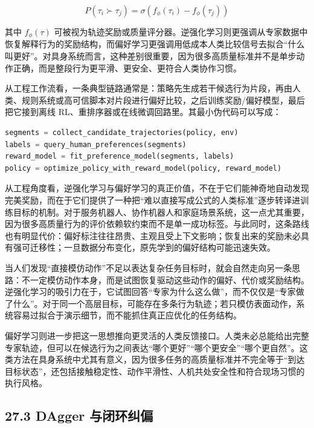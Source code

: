 \begingroup
\footnotesize
\begin{equation*}
P(\tau_i \succ \tau_j) = \sigma(f_\phi(\tau_i) - f_\phi(\tau_j))
\end{equation*}
\endgroup

其中 \(f_\phi(\tau)\) 可被视为轨迹奖励或质量评分器。逆强化学习则更强调从专家数据中恢复解释行为的奖励结构，而偏好学习更强调用低成本人类比较信号去拟合“什么叫更好”。对具身系统而言，这种差别很重要，因为很多高质量标准并不是单步动作正确，而是整段行为更平滑、更安全、更符合人类协作习惯。

从工程工作流看，一条典型链路通常是：策略先生成若干候选行为片段，再由人类、规则系统或高可信脚本对片段进行偏好比较，之后训练奖励/偏好模型，最后把它接到离线 RL、重排序器或在线微调回路里。其最小伪代码可以写成：

\begin{lstlisting}[language=python]
segments = collect_candidate_trajectories(policy, env)
labels = query_human_preferences(segments)
reward_model = fit_preference_model(segments, labels)
policy = optimize_policy_with_reward_model(policy, reward_model)
\end{lstlisting}

从工程角度看，逆强化学习与偏好学习的真正价值，不在于它们能神奇地自动发现完美奖励，而在于它们提供了一种把“难以直接写成公式的人类标准”逐步转译进训练目标的机制。对于服务机器人、协作机器人和家庭场景系统，这一点尤其重要，因为很多高质量行为的评价依赖软约束而不是单一成功标签。与此同时，这条路线也有明显代价：偏好标注往往昂贵、主观且受上下文影响；恢复出来的奖励未必具有强可迁移性；一旦数据分布变化，原先学到的偏好结构可能迅速失效。

当人们发现“直接模仿动作”不足以表达复杂任务目标时，就会自然走向另一条思路：不一定模仿动作本身，而是试图恢复驱动这些动作的偏好、代价或奖励结构。逆强化学习的吸引力在于，它试图回答“专家为什么这么做”，而不仅仅是“专家做了什么”。对于同一个高层目标，可能存在多条行为轨迹；若只模仿表面动作，系统容易过拟合于演示细节，而不能抓住真正应优化的任务结构。

偏好学习则进一步把这一思想推向更灵活的人类反馈接口。人类未必总能给出完整专家轨迹，但可以在候选行为之间表达“哪个更好”“哪个更安全”“哪个更自然”。这类方法在具身系统中尤其有意义，因为很多任务的高质量标准并不完全等于“到达目标状态”，还包括接触稳定性、动作平滑性、人机共处安全性和符合现场习惯的执行风格。

\subsection*{27.3 DAgger 与闭环纠偏}


